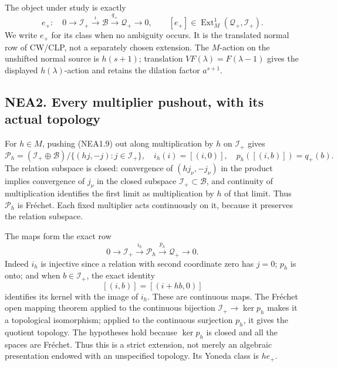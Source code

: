 The object under study is exactly \[
e_+:\quad0\longrightarrow\mathcal I_+\xrightarrow{\iota}\mathcal B
\xrightarrow{q_+}\mathcal Q_+\longrightarrow0,
\qquad
[e_+]\in\operatorname{Ext}^1_M(\mathcal Q_+,\mathcal I_+).
\tag{NEA1.9}
\] We write \(e_+\) for its class when no ambiguity occurs. It is the
translated normal row of CW/CLP, not a separately chosen extension. The
\(M\)-action on the unshifted normal source is \(h(s+1)\); translation
\(VF(\lambda)=F(\lambda-1)\) gives the displayed \(h(\lambda)\)-action
and retains the dilation factor \(a^{s+1}\).

\subsection{NEA2. Every multiplier pushout, with its actual
topology}\label{nea2.-every-multiplier-pushout-with-its-actual-topology}

For \(h\in M\), pushing (NEA1.9) out along multiplication by \(h\) on
\(\mathcal I_+\) gives \[
\mathcal P_h=(\mathcal I_+\oplus\mathcal B)/
\{(hj,-j):j\in\mathcal I_+\},
\quad
i_h(i)=[(i,0)],\quad p_h([(i,b)])=q_+(b).
\tag{NEA2.1}
\] The relation subspace is closed: convergence of \((hj_\nu,-j_\nu)\)
in the product implies convergence of \(j_\nu\) in the closed subspace
\(\mathcal I_+\subset\mathcal B\), and continuity of multiplication
identifies the first limit as multiplication by \(h\) of that limit.
Thus \(\mathcal P_h\) is Fréchet. Each fixed multiplier acts
continuously on it, because it preserves the relation subspace.

The maps form the exact row \[
0\longrightarrow\mathcal I_+\xrightarrow{i_h}\mathcal P_h
\xrightarrow{p_h}\mathcal Q_+\longrightarrow0.
\tag{NEA2.2}
\] Indeed \(i_h\) is injective since a relation with second coordinate
zero has \(j=0\); \(p_h\) is onto; and when \(b\in\mathcal I_+\), the
exact identity \[
[(i,b)]=[(i+hb,0)]
\tag{NEA2.3}
\] identifies its kernel with the image of \(i_h\). These are continuous
maps. The Fréchet open mapping theorem applied to the continuous
bijection \(\mathcal I_+\to\ker p_h\) makes it a topological
isomorphism; applied to the continuous surjection \(p_h\), it gives the
quotient topology. The hypotheses hold because \(\ker p_h\) is closed
and all the spaces are Fréchet. Thus this is a strict extension, not
merely an algebraic presentation endowed with an unspecified topology.
Its Yoneda class is \(h e_+\).

